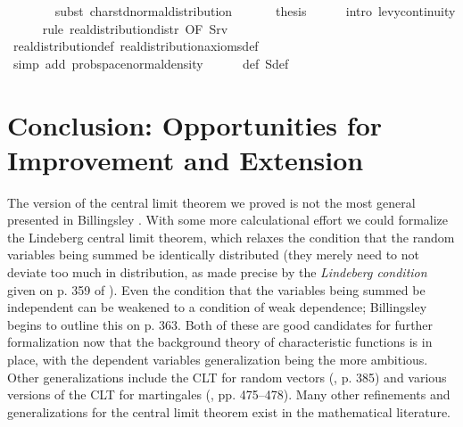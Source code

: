 \documentclass[leqno]{article}
\theoremstyle{definition}
\begin{document}
\begin{isabellebody}
\ \ \ \ \ \ \isamarkupfalse%
\ {\isacharparenleft}subst\ char{\isacharunderscore}std{\isacharunderscore}normal{\isacharunderscore}distribution{\isacharparenright}\isanewline
\ \ \isamarkupfalse%
\isanewline
\ \ \isamarkupfalse%
\ {\isacharquery}thesis\isanewline
\ \ \ \ \isamarkupfalse%
\ {\isacharparenleft}intro\ levy{\isacharunderscore}continuity{\isacharparenright}\isanewline
\ \ \ \ \isamarkupfalse%
\ {\isacharparenleft}rule\ real{\isacharunderscore}distribution{\isacharunderscore}distr\ {\isacharbrackleft}OF\ S{\isacharunderscore}rv{\isacharbrackright}{\isacharparenright}\isanewline
\ \ \ \ \isamarkupfalse%
\ real{\isacharunderscore}distribution{\isacharunderscore}def\ real{\isacharunderscore}distribution{\isacharunderscore}axioms{\isacharunderscore}def\isanewline
\ \ \ \ \isamarkupfalse%
\ {\isacharparenleft}simp\ add{\isacharcolon}\ prob{\isacharunderscore}space{\isacharunderscore}normal{\isacharunderscore}density{\isacharparenright}\isanewline
\ \ \ \ \isamarkupfalse%
\ {\isasymphi}{\isacharunderscore}def\ S{\isacharprime}{\isacharunderscore}def\ \isamarkupfalse%
\ {\isacharminus}\isanewline
{}
\end{isabellebody}

\section{Conclusion: Opportunities for Improvement and Extension}

The version of the central limit theorem we proved is not the most general presented in Billingsley \cite{billingsley}. With some more calculational effort we could formalize the Lindeberg central limit theorem, which relaxes the condition that the random variables being summed be identically distributed (they merely need to not deviate too much in distribution, as made precise by the {\em Lindeberg condition} given on p. 359 of \cite{billingsley}). Even the condition that the variables being summed be independent can be weakened to a condition of weak dependence; Billingsley begins to outline this on p. 363. Both of these are good candidates for further formalization now that the background theory of characteristic functions is in place, with the dependent variables generalization being the more ambitious. Other generalizations include the CLT for random vectors \linebreak (\cite{billingsley}, p. 385) and various versions of the CLT for martingales (\cite{billingsley}, pp. 475--478). Many other refinements and generalizations for the central limit theorem exist in the mathematical literature.
\end{document}
